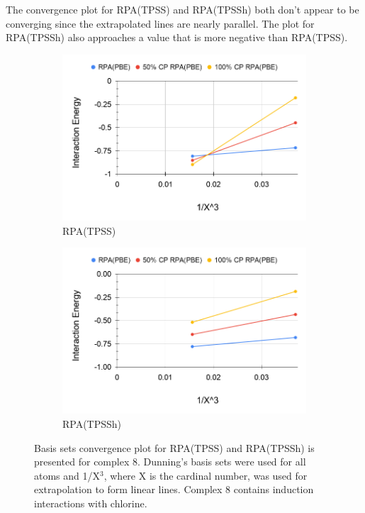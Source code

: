 \documentclass[11pt]{article}
\begin{document}
The convergence plot for RPA(TPSS) and RPA(TPSSh) both don't appear to be
converging since the extrapolated lines are nearly parallel. The plot for
RPA(TPSSh) also approaches a value that is more negative than RPA(TPSS).


\begin{figure}[H]
  \centering
  \begin{subfigure}{.5\textwidth}
    \centering
    \includegraphics[scale=0.3]{tpss-8.png}
    \caption{RPA(TPSS)}
    \label{fig:tpss_8}
  \end{subfigure}%
  \begin{subfigure}{.5\textwidth}
    \centering
    \includegraphics[scale=0.3]{tpssh-8.png}
    \caption{RPA(TPSSh)}
    \label{fig:tpssh_8}
  \end{subfigure}
  \caption{Basis sets convergence plot for RPA(TPSS) and RPA(TPSSh) is
    presented for complex 8. Dunning's basis sets were used for all atoms
    and 1/X$^3$, where X is the cardinal number, was used for extrapolation
    to form linear lines. Complex 8 contains induction interactions with
    chlorine.}
  \label{fig:complex_8}
\end{figure}
\end{document}
